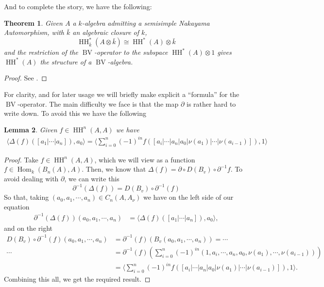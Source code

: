 \documentclass{article}
\newcommand{\HH}{\operatorname{HH}}
\newcommand{\homo}{\operatorname{Hom}}
\newcommand{\bv}{\operatorname{BV}}
\theoremstyle{plain}
\newtheorem{theorem}{Theorem}
\newtheorem{lemma}[theorem]{Lemma}
\theoremstyle{definition}
\begin{document}
And to complete the story, we have the following:
\begin{theorem} Given $A$ a $k$-algebra admitting a semisimple Nakayama Automorphism, with $\bar{k}$ an algebraic closure of $k$, 
$$\HH^*_{\bar{k}}(A \otimes \bar{k}) \cong \HH^*(A) \otimes \bar{k}$$
and the restriction of the $\bv$-operator to the subspace $\HH^*(A) \otimes 1$ gives $\HH^*(A)$ the structure of a $\bv$-algebra.
\end{theorem}
\begin{proof} See \cite{Lambre}. \end{proof}
For clarity, and for later usage we will briefly make explicit a ``formula'' for the $\bv$-operator. The main difficulty we face is that the map $\partial$ is rather hard to write down. To avoid this we have the following
\begin{lemma} Given $f \in \HH^n(A,A)$ we have 
$$\begin{aligned} \langle \Delta(f)([a_1 |\cdots | a_n ]), a_0\rangle =  \langle  \sum_{i=0}^n (-1)^{in}f([ a_i | \cdots | a_n | a_0 | \nu(a_1) | \cdots | \nu(a_{i-1}) ]), 1 \rangle \end{aligned}$$
\end{lemma}
\begin{proof}
 Take $f\in \HH^n(A,A)$, which we will view as a function $f \in \homo_{k}({B}_n(A), A)$. Then, we know that $\Delta(f) = \partial \circ D(B_v) \circ \partial^{-1} f$. To avoid dealing with $\partial$, we can write this
$$\partial^{-1}(\Delta(f)) = D(B_v) \circ \partial^{-1}(f)$$
So that, taking $(a_0, a_1, \cdots, a_n) \in C_n(A,A_\nu)$  we have on the left side of our equation
$$\begin{aligned}\partial^{-1}(\Delta(f))(a_0, a_1, \cdots, a_n) &=  \langle  \Delta(f)( [ a_1 | \cdots | a_n ]), a_0 \rangle,
\end{aligned}$$
and on the right
$$\begin{aligned} D(B_v) \circ \partial^{-1}(f)(a_0,a_1,\cdots, a_n) &= \partial^{-1}(f)(B_v(a_0, a_1, \cdots, a_n)) = \cdots\\
\cdots &=\partial^{-1}(f)\left(\sum_{i=0}^n (-1)^{in} (1 , a_i , \cdots , a_n , a_0 , \nu(a_1) , \cdots , \nu(a_{i-1}))\right) \\
&= \langle  \sum_{i=0}^n (-1)^{in}f([a_i | \cdots | a_n | a_0 | \nu(a_1) | \cdots | \nu(a_{i-1}) ]), 1 \rangle.
\end{aligned}$$
Combining this all, we get the required result.
\end{proof}
\end{document}
